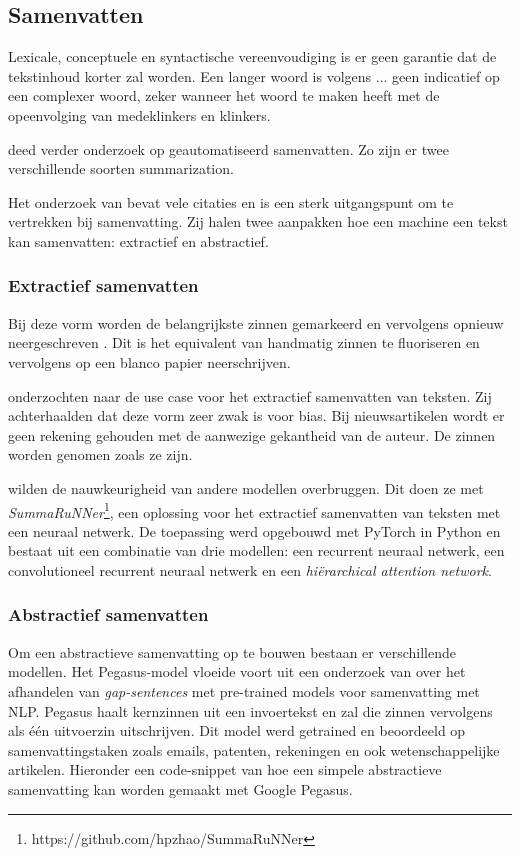 \subsection{Samenvatten}

Lexicale, conceptuele en syntactische vereenvoudiging is er geen garantie dat de tekstinhoud korter zal worden. Een langer woord is volgens ... geen indicatief op een complexer woord, zeker wanneer het woord te maken heeft met de opeenvolging van medeklinkers en klinkers.

\textcite{Wafaa2021} deed verder onderzoek op geautomatiseerd samenvatten. Zo zijn er twee verschillende soorten summarization. 

Het onderzoek van \textcite{Hahn2000} bevat vele citaties en is een sterk uitgangspunt om te vertrekken bij samenvatting. Zij halen twee aanpakken hoe een machine een tekst kan samenvatten: extractief en abstractief.

\subsubsection*{Extractief samenvatten}

Bij deze vorm worden de belangrijkste zinnen gemarkeerd en vervolgens opnieuw neergeschreven \textcite{Hahn2000}. Dit is het equivalent van handmatig zinnen te fluoriseren en vervolgens op een blanco papier neerschrijven. 

\textcite{McKeown1999} onderzochten naar de use case voor het extractief samenvatten van teksten. Zij achterhaalden dat deze vorm zeer zwak is voor bias. Bij nieuwsartikelen wordt er geen rekening gehouden met de aanwezige gekantheid van de auteur. De zinnen worden genomen zoals ze zijn.

\textcite{Nallapati2017} wilden de nauwkeurigheid van andere modellen overbruggen. Dit doen ze met \textit{SummaRuNNer}\footnote{https://github.com/hpzhao/SummaRuNNer}, een oplossing voor het extractief samenvatten van teksten met een neuraal netwerk. De toepassing werd opgebouwd met PyTorch in Python en bestaat uit een combinatie van drie modellen: een recurrent neuraal netwerk, een convolutioneel recurrent neuraal netwerk en een \textit{hiërarchical attention network}.

\subsubsection*{Abstractief samenvatten}

Om een abstractieve samenvatting op te bouwen bestaan er verschillende modellen. Het Pegasus-model vloeide voort uit een onderzoek van \textcite{Zhang2020} over het afhandelen van \textit{gap-sentences} met pre-trained models voor samenvatting met NLP. Pegasus haalt kernzinnen uit een invoertekst en zal die zinnen vervolgens als één uitvoerzin uitschrijven. Dit model werd getrained en beoordeeld op samenvattingstaken zoals emails, patenten, rekeningen en ook wetenschappelijke artikelen. Hieronder een code-snippet van hoe een simpele abstractieve samenvatting kan worden gemaakt met Google Pegasus.


